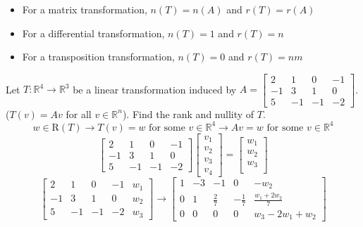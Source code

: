 \documentclass[12pt]{article}
\begin{document}
\begin{example} \begin{itemize} 
\item For a matrix transformation, $n(T) = n(A)$ and $r(T) = r(A)$ 
\item For a differential transformation, $n(T) = 1$ and $r(T) = n$ 
\item For a transposition transformation, $n(T) = 0$ and $r(T) = nm$ \end{itemize} \end{example} 
\begin{example} Let $T: \mathbb{R}^4 \to \mathbb{R}^3$ be a linear transformation induced by $A = \left[\begin{array}{cccc}2 & 1 & 0 & -1 \\-1 & 3 & 1 & 0 \\5 & -1 & -1 & -2\end{array}\right]$. ($T(v) = Av$ for all $v \in \mathbb{R}^n$). Find the rank and nullity of $T$. $$w \in \mathrm{R}(T) \rightarrow T(v) = w \text{ for some } v \in \mathbb{R}^4 \rightarrow Av = w \text{ for some } v \in \mathbb{R}^4 $$ 
$$\left[\begin{array}{cccc}2 & 1 & 0 & -1 \\-1 & 3 & 1 & 0 \\5 & -1 & -1 & -2\end{array}\right]\left[\begin{array}{c}v_1 \\v_2 \\v_3 \\v_4 \end{array}\right] = \left[\begin{array}{c}w_1 \\w_2 \\w_3 \\ \end{array}\right] $$ $$\left[\begin{array}{ccccc}2 & 1 & 0 & -1 & w_1 \\-1 & 3 & 1 & 0 & w_2 \\5 & -1 & -1 & -2 & w_3 \end{array}\right] \rightarrow \left[\begin{array}{ccccc}1 & -3 & -1 & 0 & -w_2 \\0 & 1 & \frac{2}{7} & -\frac{1}{7} & \frac{w_1 + 2w_2}{7} \\0 & 0 & 0 & 0 & w_3 -2w_1 + w_2 \end{array}\right] $$ 

\end{example}
\end{document}
